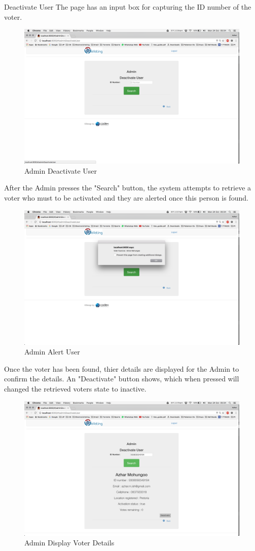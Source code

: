 \documentclass[11pt]{article}
\begin{document}
				\newpage
				Deactivate User
				The page has an input box for capturing the ID number of the voter.
				\begin{figure}[H]
					\centering
					\includegraphics[width=0.7\linewidth]{../Images/UserManual/adminWeb/admindeactivateuser.png}
					\caption{Admin Deactivate User}
				\end{figure}
				
				 After the Admin presses the "Search" button, the system attempts to retrieve a voter who must to be activated and they are alerted once this person is found.
				 \begin{figure}[H]
				 	\centering
				 	\includegraphics[width=0.7\linewidth]{../Images/UserManual/adminWeb/adminvoterfound.png}
				 	\caption{Admin Alert User}
				 \end{figure}
				 \newpage
				  Once the voter has been found, thier details are displayed for the Admin to confirm the details. An "Deactivate" button shows, which when pressed will changed the retrieved voters state to inactive. 
				 \begin{figure}[H]
				 	\centering
				 	\includegraphics[width=0.7\linewidth]{../Images/UserManual/adminWeb/adminvoterdetails.png}
				 	\caption{Admin Display Voter Details}
				 \end{figure}
				 
\end{document}
